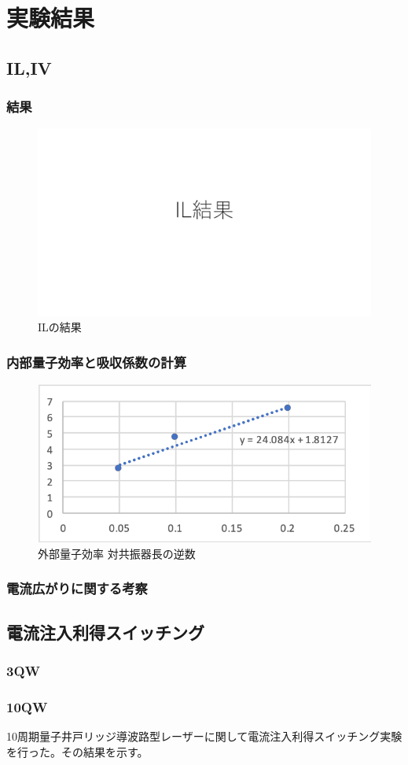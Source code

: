 \chapter{実験結果}
\section{IL,IV}
\subsection{結果}
\begin{figure}[htbp]
	\includegraphics[width=15cm]{figure/fig_IL_result.pdf}
	\caption{ILの結果}
	\label{fig:IL_result}
\end{figure}
\subsection{内部量子効率と吸収係数の計算}
\begin{figure}[htbp]
	\includegraphics[width=15cm]{figure/fig_efficientcy_vs_L_inverce.png}
	\caption{外部量子効率 対共振器長の逆数}
	\label{fig:efficientcy_vs_L_inverce}
\end{figure}
\subsection{電流広がりに関する考察}
\section{電流注入利得スイッチング}
\subsection{3QW}
\subsection{10QW}
10周期量子井戸リッジ導波路型レーザーに関して電流注入利得スイッチング実験を行った。その結果を示す。


